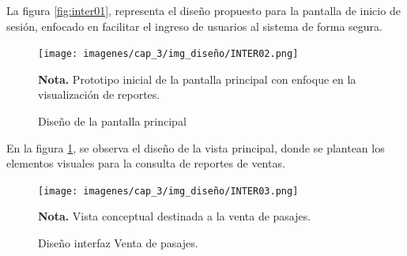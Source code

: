 	La figura \ref{fig:inter01}, representa el diseño propuesto para la pantalla de inicio de sesión, enfocado en facilitar el ingreso de usuarios al sistema de forma segura.
	
	\begin{figure}[!h] %
		\caption[Diseño de la pantalla principal]
		{\newline Diseño de la pantalla principal} %
		\centering
		\texttt{[image: imagenes/cap\_3/img\_diseño/INTER02.png]} %
		\begin{flushleft}
			\hspace{1.20cm} \textbf{Nota.} Prototipo inicial de la pantalla principal con enfoque en la visualización de reportes. %
		\end{flushleft}
		\vspace{-1pt}
		\label{fig:inter02} %
	\end{figure}
	\vspace{-0.6cm} %
	
	En la figura \ref{fig:inter02}, se observa el diseño de la vista principal, donde se plantean los elementos visuales para la consulta de reportes de ventas.
	
	
	\vspace{-1cm} %
	\begin{figure}[!h] %
		\caption[Diseño interfaz Venta de pasajes]
		{\newline Diseño interfaz Venta de pasajes.} %
		\centering
		\texttt{[image: imagenes/cap\_3/img\_diseño/INTER03.png]} %
		\begin{flushleft}
			\hspace{1.20cm} \textbf{Nota.} Vista conceptual destinada a la venta de pasajes. %
		\end{flushleft}
		\vspace{-16pt}
		\label{fig:inter03} %
	\end{figure}
	\vspace{0.9cm} %
	
